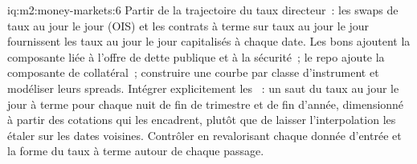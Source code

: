 \begin{solution}{iq:m2:money-markets:6}
Partir de la trajectoire du taux directeur~: les swaps de taux au jour le jour (OIS) et les
contrats à terme sur taux au jour le jour fournissent les taux au jour le jour capitalisés à chaque date.
Les bons ajoutent la composante liée à l'offre de dette publique et à la sécurité~; le repo ajoute la composante
de collatéral~; construire une courbe par classe d'instrument et modéliser leurs spreads. Intégrer
explicitement les ~: un saut du taux au jour le jour à terme pour chaque nuit de fin
de trimestre et de fin d'année, dimensionné à partir des cotations qui les encadrent, plutôt que de laisser
l'interpolation les étaler sur les dates voisines. Contrôler en revalorisant
chaque donnée d'entrée et la forme du taux à terme autour de chaque passage.
\end{solution}
